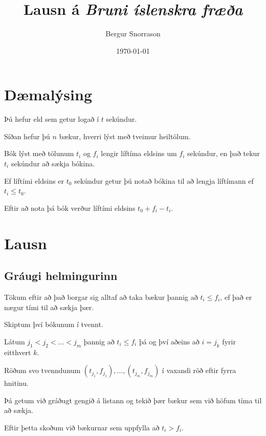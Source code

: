 \title{Lausn á \emph{Bruni íslenskra fræða}}
\author{Bergur Snorrason}
\date{\today}



\frame{\titlepage}

\section{Dæmalýsing}
{
	{
		\item<1-> Þú hefur eld sem getur logað í $t$ sekúndur.
		\item<2-> Síðan hefur þú $n$ bækur, hverri lýst með tveimur heiltölum.
		\item<3-> Bók lýst með tölunum $t_i$ og $f_i$ lengir líftíma eldsins um $f_i$ sekúndur, en það tekur $t_i$ sekúndur að sækja bókina.
		\item<4-> Ef líftími eldsins er $t_0$ sekúndur getur þú notað bókina til að lengja líftímann ef $t_i \leq t_0$.
		\item<5-> Eftir að nota þá bók verður líftími eldsins $t_0 + f_i - t_i$.
	}
}

\section{Lausn}
\subsection{Gráugi helmingurinn}
{
	{
		\item<1-> Tökum eftir að það borgar sig alltaf að taka bækur þannig að $t_i \leq f_i$, ef það er nægur tími til að sækja þær.
		\item<2-> Skiptum því bókunum í tvennt.
		\item<3-> Látum $j_1 < j_2 < \dots < j_m$ þannig að $t_i \leq f_i$ þá og því aðeins að $i = j_k$ fyrir eitthvert $k$.
		\item<4-> Röðum svo tvenndunum $(t_{j_1}, f_{j_1}), \dots, (t_{j_m}, f_{j_m})$ í vaxandi röð eftir fyrra hnitinu.
		\item<5-> Þá getum við gráðugt gengið á listann og tekið þær bækur sem við höfum tíma til að sækja.
		\item<6-> Eftir þetta skoðum við bækurnar sem uppfylla að $t_i > f_i$.
	}
}

